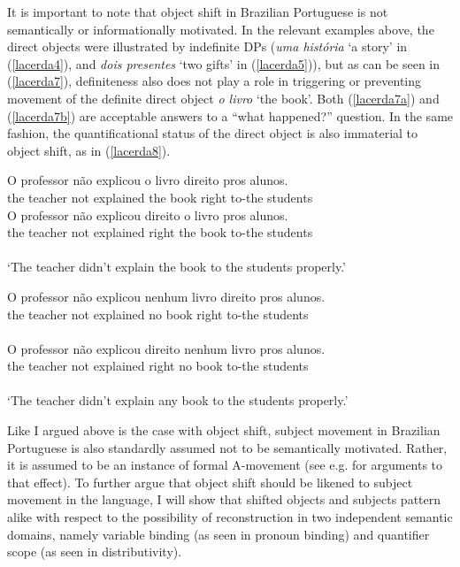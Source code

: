 \documentclass[output=paper]{langscibook}
\begin{document}
It is important to note that object shift in Brazilian Portuguese is not semantically or informationally motivated. In the relevant examples above, the direct objects were illustrated by indefinite DPs (\emph{uma história} ‘a story’ in (\ref{lacerda4}), and \emph{dois presentes} ‘two gifts’ in (\ref{lacerda5})), but as can be seen  in (\ref{lacerda7}), definiteness also does not play a role in triggering or preventing movement of the definite direct object \emph{o livro} ‘the book’. Both (\ref{lacerda7a}) and (\ref{lacerda7b}) are acceptable answers to a “what happened?” question. In the same fashion, the quantificational status of the direct object is also immaterial to object shift, as in (\ref{lacerda8}). 

\begin{exe}
\ex \label{lacerda7}
\begin{xlist}
\ex \label{lacerda7a}
\gll O	professor	não	explicou 	o 	livro 	direito 	pros 	alunos.\\
    the	teacher	not	explained	the	book	right	to-the	students\\

\ex \label{lacerda7b}
\gll O	professor 	não	explicou 	direito 	o	livro	pros	alunos.\\
    the	teacher	not	explained	right	the	book	to-the	students\\\\
    ‘The teacher didn’t explain the book to the students properly.’\\

\end{xlist}

\ex \label{lacerda8}
\begin{xlist}
\ex \label{lacerda8a}
\gll O	professor	não	explicou 	nenhum	livro	direito 	pros 	alunos.\\
the	teacher	not	explained	no	book	right	to-the	students\\\\

\ex \label{lacerda8b}
\gll O	professor 	não	explicou 	direito 	nenhum	livro	pros	alunos.\\
    the	teacher	not	explained	right	no	book	to-the	students\\\\
    ‘The teacher didn’t explain any book to the students properly.’

\end{xlist}
\end{exe}

Like I argued above is the case with object shift, subject movement in Brazilian Portuguese is also standardly assumed not to be semantically motivated. Rather, it is assumed to be an instance of formal A-movement (see e.g. \citealt{Nunes2010} for arguments to that effect). To further argue that object shift should be likened to subject movement in the language, I will show that shifted objects and subjects pattern alike with respect to the possibility of reconstruction in two independent semantic domains, namely variable binding (as seen in pronoun binding) and quantifier scope (as seen in distributivity).
\end{document}
